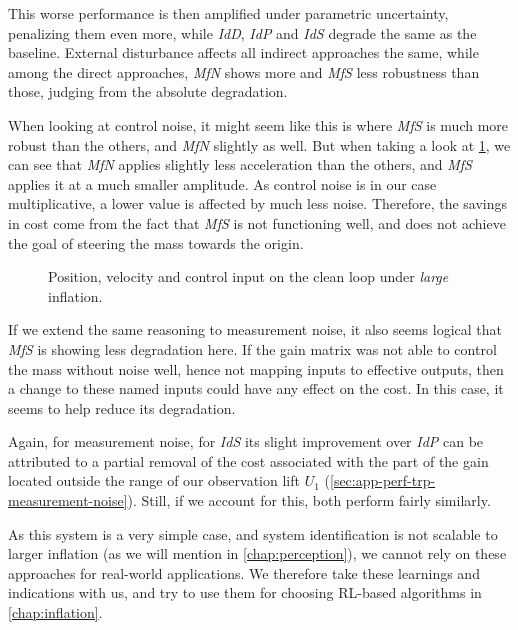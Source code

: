 This worse performance is then amplified under parametric uncertainty, penalizing them even
more, while \emph{IdD}, \emph{IdP} and \emph{IdS} degrade the same as the baseline. External disturbance affects
all indirect approaches the same, while among the direct approaches, \emph{MfN} shows more
and \emph{MfS} less robustness than those, judging from the absolute degradation.

When looking at control noise, it might seem like this is where \emph{MfS} is much more robust than the
others, and \emph{MfN} slightly as well. But when taking a look at \cref{fig:identified-large-trajectories}, we
can see that \emph{MfN} applies slightly less acceleration than the others, and \emph{MfS} applies it at a
much smaller amplitude. As control noise is in our case multiplicative, a lower value is affected
by much less noise. Therefore, the savings in cost come from the fact that \emph{MfS} is not functioning
well, and does not achieve the goal of steering the mass towards the origin.

\begin{figure}[htbp]
  \centering
  \caption{Position, velocity and control input on the clean loop under \emph{large} inflation.}
  \label{fig:identified-large-trajectories}
\end{figure}

If we extend the same reasoning to measurement noise, it also seems logical that \emph{MfS} is showing less
degradation here. If the gain matrix was not able to control the mass without noise well, hence not
mapping inputs to effective outputs, then a change to these named inputs could have any effect on
the cost. In this case, it seems to help reduce its degradation.

Again, for measurement noise, for \emph{IdS} its slight improvement over \emph{IdP} can be attributed
to a partial removal of the cost associated with the part of the gain located outside the range of
our observation lift $U_1$ (\cref{sec:app-perf-trp-measurement-noise}). Still, if we account for this,
both perform fairly similarly.

As this system is a very simple case, and system identification is not scalable to larger inflation
(as we will mention in \cref{chap:perception}), we cannot rely on these approaches for real-world applications. We
therefore take these learnings and indications with us, and try to use them for choosing RL-based algorithms
in \cref{chap:inflation}.